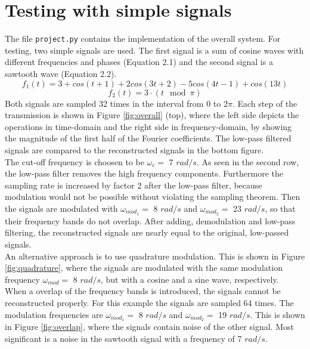 \documentclass[12pt, a4paper]{report}
\begin{document}
\section{Testing with simple signals}
The file \texttt{project.py} contains the implementation of the overall system.
For testing, two simple signals are used. The first signal is a sum of cosine waves with different frequencies and phases (Equation 2.1) and the second signal is a sawtooth wave (Equation 2.2).
\begin{equation}
	f_1(t) = 3 + cos(t+1) + 2cos(3t+2) - 5cos(4t-1) + cos(13t)
\end{equation}
\begin{equation}
	f_2(t) = 3 \cdot (t\mod\pi)
\end{equation}
Both signals are sampled 32 times in the interval from 0 to 2\(\pi\). Each step of the transmission is shown in Figure \ref{fig:overall} (top), where the left side depicts the operations in time-domain and the right side in frequency-domain, by showing the magnitude of the first half of the Fourier coefficients. The low-pass filtered signals are compared to the reconstructed signals in the bottom figure.\\
The cut-off frequency is choosen to be \(\omega_c=\) 7 \(rad/s\). As seen in the second row, the low-pass filter removes the high frequency components. Furthermore the sampling rate is increased by factor 2 after the low-pass filter, because modulation would not be possible without violating the sampling theorem. Then the signals are modulated with \(\omega_{mod_1}=\) 8 \(rad/s\) and \(\omega_{mod_2}=\) 23 \(rad/s\), so that their frequency bands do not overlap. After adding, demodulation and low-pass filtering, the reconstructed signals are nearly equal to the original, low-passed signals.\\
An alternative approach is to use quadrature modulation. This is shown in Figure \ref{fig:quadrature}, where the signals are modulated with the same modulation frequency \(\omega_{mod}=\) 8 \(rad/s\), but with a cosine and a sine wave, respectively.\\
When a overlap of the frequency bands is introduced, the signals cannot be reconstructed properly. For this example the signals are sampled 64 times.
The modulation frequencies are \(\omega_{mod_1}=\) 8 \(rad/s\) and \(\omega_{mod_2}=\) 19 \(rad/s\). This is shown in Figure \ref{fig:overlap},
where the signals contain noise of the other signal. Most significant is a noise in the sawtooth signal with a frequency of 7 \(rad/s\).
\end{document}
